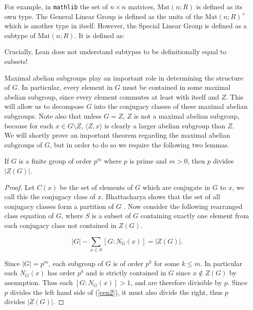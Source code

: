 \begin{example}
  For example, in \texttt{mathlib} the set of $n \times n$ matrices, $\textrm{Mat}(n; R)$ is defined as its own type. The General Linear Group is defined as the units
  of the $\textrm{Mat}(n; R)^\times$ which is another type in itself. However, the Special Linear Group is defined as a subtype of $\textrm{Mat}(n; R)$. It is defined as:

  Crucially, Lean does not understand subtypes to be definitionally equal to subsets! 
\end{example}

\vspace{3mm}

Maximal abelian subgroups play an important role in determining the structure of $G$. 
In particular, every element in $G$ must be contained in some maximal abelian subgroup, since every element commutes at least with itself and $Z$.
This will allow us to decompose $G$ into the conjugacy classes of these maximal abelian subgroups. Note also that unless $G=Z$, $Z$ is not a maximal abelian subgroup, because for each $x \in G \! \setminus \! Z$, $\langle Z,x \rangle$ is clearly a larger abelian subgroup than $Z$. \\

We will shortly prove an important theorem regarding the maximal abelian subgroups of $G$, but in order to do so we require the following two lemmas. \\

\begin{lemma}
  \label{IsElementaryAbelian.dvd_card}
  \leanok
If $G$ is a finite group of order $p^m$ where $p$ is prime and $m > 0$, then $p$ divides $|Z(G)|$. 
\end{lemma}
\begin{proof}
Let $C(x)$ be the set of elements of $G$ which are conjugate in $G$ to $x$, we call this the conjugacy class of $x$. Bhattacharya shows that the set of all conjugacy classes form a partition of $G$ \cite[p.112]{bhattacharya}. 
Now consider the following rearranged class equation of $G$, where $S$ is a subset of $G$ containing exactly one element from each conjugacy class not contained in $Z(G)$. 
 
\begin{equation} \label{cen2}
|G| - \sum_{x \in S} [G:N_G(x)] = |Z(G)|.
\end{equation}

Since $|G| = p^m$, each subgroup of $G$ is of order $p^k$ for some $k \leq m$. In particular each $N_G(x)$ has order $p^k$ and is strictly contained in $G$ since $x \not \in Z(G)$ by assumption. Thus each $[G:N_G(x)] > 1$, and are therefore divisible by $p$. Since $p$ divides the left hand side of (\ref{cen2}), it must also divide the right, thus $p$ divides $|Z(G)|$. 

\end{proof}



